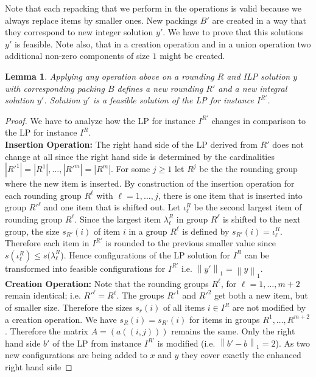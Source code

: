 \documentclass[a4paper,11pt]{article}
\newcommand{\nor}[1]{\left\|#1\right\|}
\newtheorem{lem}[thm]{Lemma}
\begin{document}
Note that each repacking that we perform in the operations is valid because we always replace items by smaller ones.
New packings $B'$ are created in a way that they correspond to new integer solution $y'$. We have to prove that
this solutions $y'$ is feasible. Note also, that in a creation operation and in a union operation two additional
non-zero components of size $1$ might be created.
\begin{lem}\label{lem12}
	Applying any operation above on a rounding $R$ and ILP solution $y$ with corresponding packing $B$ defines
	a new rounding $R'$ and a new integral solution $y'$. Solution $y'$ is a feasible solution of the LP
	for instance $I^{R'}$.
\end{lem}
\begin{proof}
	We have to analyze how the LP for instance $I^{R'}$ changes in comparison to the LP for instance $I^R$.
	\\{\bf Insertion Operation:} The right hand side of the LP derived from $R'$ does not change at all since
	the right hand side is determined by the cardinalities $|R'^1|=|R^1|, \ldots, |R'^m|=|R^m|$. 
	For some $j \geq 1$ let $R^j$ be the the rounding group where the new item is inserted.
	By construction of the insertion operation for each rounding group $R^{\ell}$ with $\ell = 1, \ldots, j$, there is
	one item that is inserted into group $R'^{\ell}$ and one item that is shifted out.
	Let $\iota_{\ell}^R$ be the second largest item of rounding group $R^{\ell}$.
	Since the largest item $\lambda_{\ell}^R$ in group $R^{\ell}$ is shifted to the next group,
	the size $s_{R'}(i)$ of item $i$ in a group $R^{\ell}$ is defined by $s_{R'}(i) = \iota_{\ell}^R$.
	Therefore each item in $I^{R'}$ is rounded to the previous smaller value since $s(\iota_{\ell}^R) 
	\leq s(\lambda_{\ell}^R$).
	Hence configurations of the LP solution for $I^R$ can be transformed into feasible configurations for $I^{R'}$
	i.e. $\nor{y'}_1 = \nor{y}_1$.\\
	{\bf Creation Operation:}
	Note that the rounding groups $R^{\ell}$, for $\ell = 1, \ldots, m+2$ remain identical; i.e. $R'^{\ell} = R^{\ell}$.
	The groups $R'^1$ and $R'^2$ get both a new item, but of smaller size. Therefore the sizes $s_r(i)$ of all items
	$i \in I^R$ are not modified by a creation operation. We have $s_R(i) = s_{R'}(i)$ for items in groups 
	$R^1, \ldots , R^{m+2}$. Therefore the matrix $A = (a((i,j)))$ remains the same. Only the right hand side $b'$
	of the LP from instance $I^{R'}$ is modified (i.e. $\nor{b'-b}_1 =2$).
	As two new configurations are being added to $x$ and $y$ they cover exactly the enhanced right hand side

\end{proof}
\end{document}

